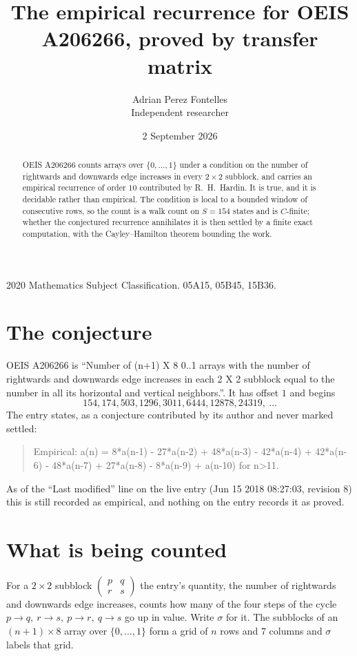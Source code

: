 \documentclass[11pt,a4paper]{article}
\title{The empirical recurrence for OEIS A206266, proved by transfer matrix}
\author{Adrian Perez Fontelles\\ \small Independent researcher}
\date{2 September 2026}
\theoremstyle{plain}
\theoremstyle{definition}
\begin{document}
\maketitle

\begin{abstract}
OEIS A206266 counts arrays over $\{0,\dots,1\}$ under a condition on the number of rightwards and downwards edge increases
in every $2\times2$ subblock, and carries an empirical recurrence of order $10$ contributed by
R.~H.~Hardin. It is true, and it is decidable rather than empirical. The condition is local to
a bounded window of consecutive rows, so the count is a walk count on $S=154$ states and is
$C$-finite; whether the conjectured recurrence annihilates it is then settled by a finite exact
computation, with the Cayley--Hamilton theorem bounding the work.
\end{abstract}

\noindent\small 2020 Mathematics Subject Classification. 05A15, 05B45, 15B36.\normalsize

\section{The conjecture}

OEIS A206266 is ``Number of (n+1) X 8 0..1 arrays with the number of rightwards and downwards edge increases in each 2 X 2 subblock equal to the number in all its horizontal and vertical neighbors.''. It has offset $1$ and begins
\[
154, 174, 503, 1296, 3011, 6444, 12878, 24319,\ \dots
\]
The entry states, as a conjecture contributed by its author and never marked settled:
\begin{quote}
Empirical: a(n) = 8*a(n-1) - 27*a(n-2) + 48*a(n-3) - 42*a(n-4) + 42*a(n-6) - 48*a(n-7) + 27*a(n-8) - 8*a(n-9) + a(n-10) for n>11.
\end{quote}
As of the ``Last modified'' line on the live entry (Jun 15 2018 08:27:03, revision 8) this is still
recorded as empirical, and nothing on the entry records it as proved.

\section{What is being counted}

For a $2\times2$ subblock $\begin{pmatrix}p&q\\r&s\end{pmatrix}$ the
entry's quantity, the number of rightwards and downwards edge increases, counts how many of the four steps of the cycle $p\to q,\ r\to s,\ p\to r,\ q\to s$ go up in value. Write $\sigma$ for it. The subblocks of an
$(n+1)\times8$ array over $\{0,\dots,1\}$ form a grid of $n$ rows and $7$
columns and $\sigma$ labels that grid.
\end{document}
